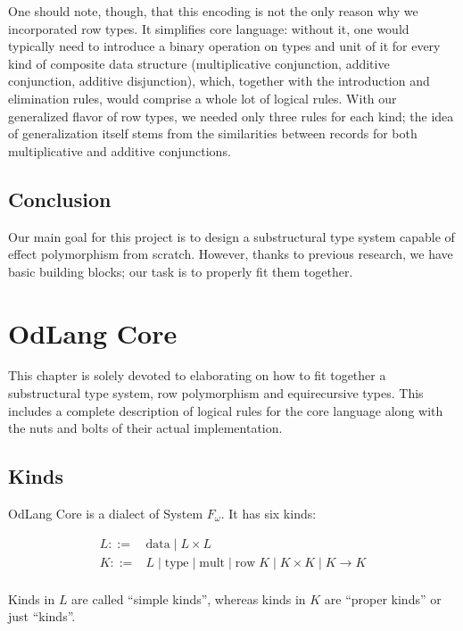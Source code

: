 \documentclass[a4paper,14pt]{extreport}
\begin{document}
One should note, though, that this encoding is not the only reason why we
incorporated row types. It simplifies core language: without it, one would
typically need to introduce a binary operation on types and unit of it for every
kind of composite data structure (multiplicative conjunction, additive
conjunction, additive disjunction), which, together with the introduction and
elimination rules, would comprise a whole lot of logical rules. With our
generalized flavor of row types, we needed only three rules for each kind; the
idea of generalization itself stems from the similarities between records for
both multiplicative and additive conjunctions.

\section*{Conclusion}

Our main goal for this project is to design a substructural type system capable
of effect polymorphism from scratch. However, thanks to previous research, we
have basic building blocks; our task is to properly fit them together.

\chapter{OdLang Core}

This chapter is solely devoted to elaborating on how to fit together a
substructural type system, row polymorphism and equirecursive types. This
includes a complete description of logical rules for the core language along
with the nuts and bolts of their actual implementation.

\section{Kinds}

OdLang Core is a dialect of System $F_\omega$. It has six kinds:

\[
    \begin{array}{rl}
        L ::=& \text{data} \;|\; L \times L \\
        K ::=& L \;|\; \text{type} \;|\; \text{mult} \;|\; \text{row} \; K
            \;|\; K \times K \;|\; K \to K \\
    \end{array}
\]

Kinds in $L$ are called ``simple kinds'', whereas kinds in $K$ are ``proper
kinds'' or just ``kinds''.
\end{document}
